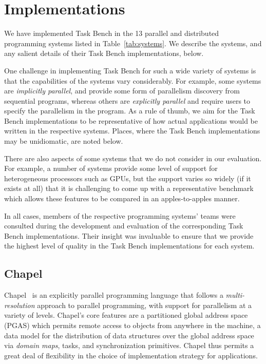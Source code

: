 \section{Implementations}
\label{sec:implementation}



We have implemented Task Bench in the 13 parallel and distributed
programming systems listed in Table~\ref{tab:systems}. We describe the
systems, and any salient details of their Task Bench implementations,
below.

One challenge in implementing Task Bench for such a wide variety of
systems is that the capabilities of the systems vary considerably. For
example, some systems are \emph{implicitly parallel}, and provide some
form of parallelism discovery from sequential programs, whereas others
are \emph{explicitly parallel} and require users to specify the
parallelism in the program. As a rule of thumb, we aim for the Task
Bench implementations to be representative of how actual applications
would be written in the respective systems. Places, where the Task
Bench implementations may be unidiomatic, are noted below.

There are also aspects of some systems that we do not consider in our
evaluation. For example, a number of systems provide some level of
support for heterogeneous processors such as GPUs, but the support
varies so widely (if it exists at all) that it is challenging to come
up with a representative benchmark which allows these features to be
compared in an apples-to-apples manner.

In all cases, members of the respective programming systems' teams
were consulted during the development and evaluation of the
corresponding Task Bench implementations. Their insight was invaluable
to ensure that we provide the highest level of quality in the Task
Bench implementations for each system.

\subsection{Chapel}

Chapel~\cite{Chapel07} is an explicitly parallel programming language
that follows a \emph{multi-resolution} approach to parallel
programming, with support for parallelism at a variety of
levels. Chapel's core features are a partitioned global address space
(PGAS) which permits remote access to objects from anywhere in the
machine, a data model for the distribution of data structures over the
global address space via \emph{domain maps}, tasks, and
synchronization primitives. Chapel thus permits a great deal of
flexibility in the choice of implementation strategy for applications.

